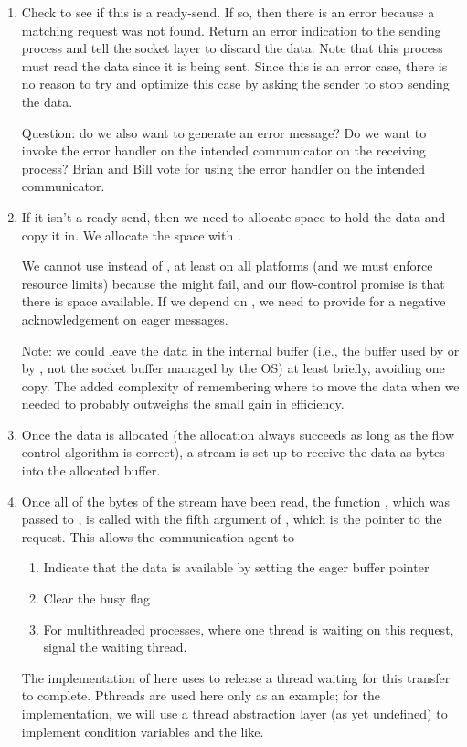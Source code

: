 \begin{enumerate}
\item Check to see if this is a ready-send.  If so, then there is an error
  because a matching request was not found.  Return an error indication to the
  sending process and tell the socket layer to discard the data.
  Note that this process must read the data since it is being sent.  Since
  this is an error case, there is no reason to try and optimize this case by
  asking the sender to stop sending the data.
  
  Question: do we also want to generate an error message?  Do we want to invoke
  the error handler on the intended communicator on the receiving process?
  Brian and Bill vote for using the error handler on the intended communicator.

\item If it isn't a ready-send, then we need to allocate space to hold the
  data and copy it in.  We allocate the space with
  . 

  We cannot
  use  instead of , at least on all
  platforms (and we must enforce 
  resource limits) because the  might fail, and our flow-control
  promise is that there is space available.  If we depend on , we
  need to provide for a negative acknowledgement on eager messages.

  Note: we could leave the data in the internal buffer (i.e., the buffer used
  by  or by , not the socket buffer
  managed by the OS) at least briefly,
  avoiding one copy.  The added complexity of remembering where to move the
  data when we needed to probably outweighs the small gain in efficiency.

\item Once the data is allocated (the allocation always succeeds as long as
  the flow control algorithm is correct), a stream is set up to receive the
  data as bytes into the allocated buffer.  

\item Once all of the bytes of the stream have been read, the function
  , which was passed to
  , is called with the fifth argument of
  , which is the pointer to the request.  This
  allows the communication agent to 
  \begin{enumerate}
  \item Indicate that the data is available by setting the eager buffer
    pointer
  \item Clear the busy flag
  \item For multithreaded processes, where one thread is waiting on this
    request, signal the waiting thread.
  \end{enumerate}
  The implementation of  here uses
   to release a thread waiting for this transfer to
  complete.  Pthreads are used here only as an example; for the
  implementation, we will use a thread abstraction layer (as yet undefined) to
  implement condition variables and the like.

\end{enumerate}

